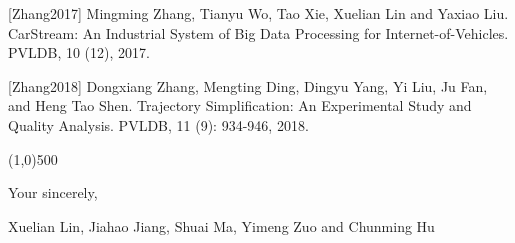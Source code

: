 \documentclass{letter}
\begin{document}
[Zhang2017] Mingming Zhang, Tianyu Wo, Tao Xie, Xuelian Lin and Yaxiao Liu. CarStream: An Industrial System of Big Data Processing for Internet-of-Vehicles. PVLDB, 10 (12), 2017.

[Zhang2018] Dongxiang Zhang, Mengting Ding, Dingyu Yang, Yi Liu, Ju Fan, and Heng Tao Shen. Trajectory Simplification: An Experimental Study and Quality Analysis. PVLDB, 11 (9): 934-946, 2018.

\line(1,0){500}

Your sincerely,

Xuelian Lin, Jiahao Jiang, Shuai Ma, Yimeng Zuo and Chunming Hu
\end{document}
